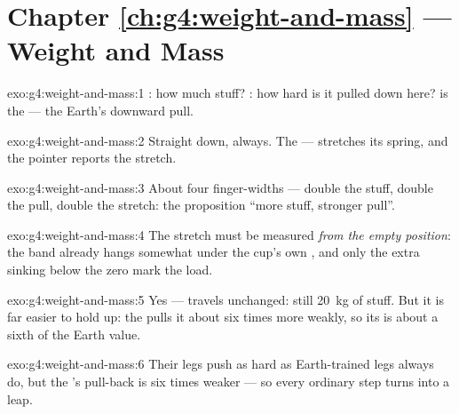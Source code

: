 \section*{Chapter \ref{ch:g4:weight-and-mass} --- Weight and Mass}

\begin{solution}{exo:g4:weight-and-mass:1}
: how much stuff? : how hard is it pulled down here?
 is the  --- the Earth's downward pull.
\end{solution}

\begin{solution}{exo:g4:weight-and-mass:2}
Straight down, always. The  ---  stretches its
spring, and the pointer reports the stretch.
\end{solution}

\begin{solution}{exo:g4:weight-and-mass:3}
About four finger-widths --- double the stuff, double the pull,
double the stretch: the proposition ``more stuff, stronger pull''.
\end{solution}

\begin{solution}{exo:g4:weight-and-mass:4}
The stretch must be measured \emph{from the empty position}: the
band already hangs somewhat under the cup's own , and only
the extra sinking below the zero mark  the load.
\end{solution}

\begin{solution}{exo:g4:weight-and-mass:5}
Yes ---  travels unchanged: still \qty{20}{kg} of stuff. But it
is far easier to hold up: the  pulls it about six times more
weakly, so its  is about a sixth of the Earth value.
\end{solution}

\begin{solution}{exo:g4:weight-and-mass:6}
Their legs push as hard as Earth-trained legs always do, but the
's pull-back is six times weaker --- so every ordinary step
turns into a leap.
\end{solution}

